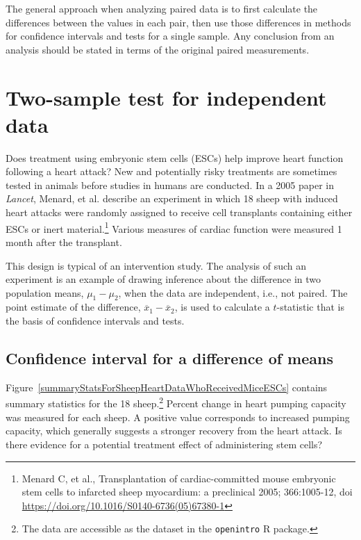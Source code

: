 The general approach when analyzing paired data is to first calculate the differences between the values in each pair, then use those differences in methods for confidence intervals and tests for a single sample.  Any conclusion from an analysis should be stated in terms of the original paired measurements.


\section{Two-sample test for independent data}
\label{differenceOfTwoMeans}

Does treatment using embryonic stem cells (ESCs) help improve heart function following a heart attack? New and potentially risky treatments are sometimes tested in animals before studies in humans are conducted.  In a 2005 paper in \textit{Lancet}, Menard, et al. describe an experiment in which 18 sheep with induced heart attacks were randomly assigned to receive cell transplants containing either ESCs or inert material.\footnote{Menard C, et al., Transplantation of cardiac-committed mouse embryonic stem cells to infarcted sheep myocardium: a preclinical 2005; 366:1005-12, doi \url{https://doi.org/10.1016/S0140-6736(05)67380-1}}  Various measures of cardiac function were measured 1 month after the transplant.

This design is typical of an intervention study. The analysis of such an experiment is an example of drawing inference about the difference in two population means, $\mu_1 - \mu_2$, when the data are independent, i.e., not paired. The point estimate of the difference, $\overline{x}_1 - \overline{x}_2$, is used to calculate a $t$-statistic that is the basis of confidence intervals and tests.


\subsection{Confidence interval for a difference of means}
\label{confidenceIntervalDifferenceMeans}

Figure~\ref{summaryStatsForSheepHeartDataWhoReceivedMiceESCs} contains summary statistics for the 18 sheep.\footnote{The data are accessible as the dataset  in the \texttt{openintro} \textsf{R} package.}  Percent change in heart pumping capacity was measured for each sheep. A positive value corresponds to increased pumping capacity, which generally suggests a stronger recovery from the heart attack.  Is there evidence for a potential treatment effect of administering stem cells?


